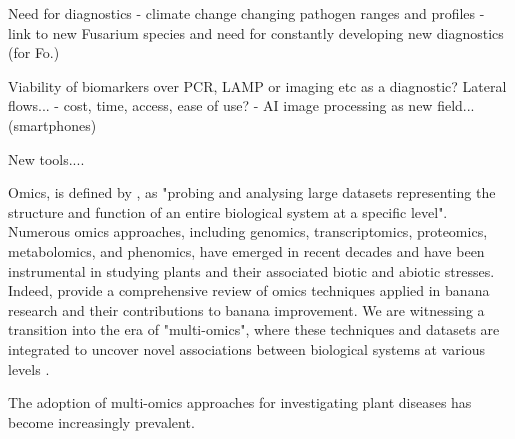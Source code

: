 
Need for diagnostics - climate change changing pathogen ranges and profiles
    - link to new Fusarium species and need for constantly developing new diagnostics (for Fo.)
    
Viability of biomarkers over PCR, LAMP or imaging etc as a diagnostic? Lateral flows...
    - cost, time, access, ease of use?
    - AI image processing as new field... (smartphones)


New tools....


Omics, is defined by \textcite{Dai2022}, as "probing and analysing large datasets representing the structure and function of an entire biological system at a specific level". Numerous omics approaches, including genomics, transcriptomics, proteomics, metabolomics, and phenomics, have emerged in recent decades and have been instrumental in studying plants and their associated biotic and abiotic stresses. Indeed, \textcite{Backiyarani2022} provide a comprehensive review of omics techniques applied in banana research and their contributions to banana improvement. We are witnessing a transition into the era of "multi-omics", where these techniques and datasets are integrated to uncover novel associations between biological systems at various levels \parencite{Hasin2017}.

The adoption of multi-omics approaches for investigating plant diseases has become increasingly prevalent. 